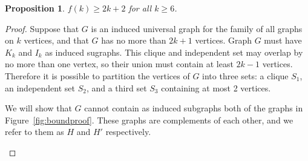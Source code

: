 \documentclass[12pt]{article}
\newtheorem{proposition}{Proposition}
\begin{document}
\begin{proposition}\label{f6proposition}
    $f(k) \geq 2k + 2$ for all $k \geq 6$.
\end{proposition}
\begin{proof}

    Suppose that $G$ is an induced universal graph for the family of all graphs
    on $k$ vertices, and that $G$ has no more than $2k + 1$ vertices.  Graph
    $G$ must have $K_k$ and $I_k$ as induced sugraphs.  This clique and
    independent set may overlap by no more than one vertex, so their union must
    contain at least $2k - 1$ vertices.  Therefore it is possible to partition
    the vertices of $G$ into three sets: a clique $S_1$, an independent set
    $S_2$, and a third set $S_3$ containing at most 2 vertices.

    We will show that $G$ cannot contain as induced subgraphs both
    of the graphs in Figure~\ref{fig:boundproof}.  These graphs are complements
    of each other, and we refer to them as $H$ and $H'$ respectively.

\begin{figure}[htb]
    \centering


\end{figure}
\end{proof}
\end{document}
